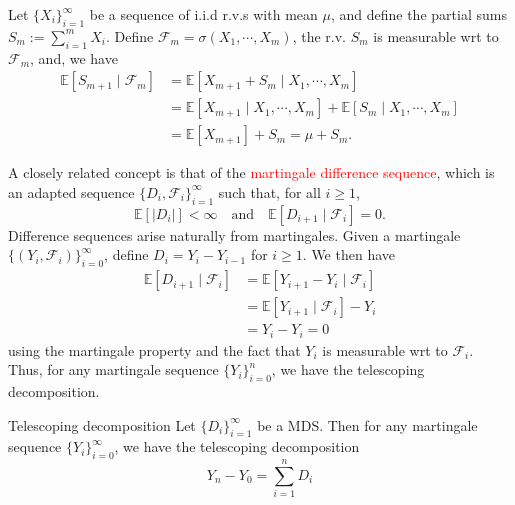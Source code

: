\documentclass[10pt,handout,english]{beamer}
\newcommand{\E}{\mathbb{E}}
\newcommand{\F}{\mathcal{F}}
\begin{document}
\begin{frame}[allowframebreaks]
\begin{example}
Let $\{X_i\}_{i=1}^{\infty}$ be a sequence of i.i.d r.v.s with mean $\mu$, and define the partial sums $S_m:=\sum\limits_{i=1}^mX_i$. Define $\F_{m}=\sigma(X_1,\cdots,X_m)$, the r.v. $S_m$ is measurable wrt to $\F_m$, and, we have
\begin{align*}
\E[S_{m+1}\mid \F_{m}]&=\E[X_{m+1}+S_{m}\mid X_1,\cdots,X_m ]\\
&=\E[X_{m+1}\mid X_1,\cdots,X_m]+\E[S_{m}\mid X_1,\cdots,X_m ]\\
&=\E[X_{m+1}]+S_m=\mu+S_m.
\end{align*}
\end{example}
A closely related concept is that of the \textcolor{red}{martingale difference sequence}, which is an adapted sequence $\{D_i,\F_{i}\}_{i=1}^{\infty}$ such that, for all $i\geq 1$,
\[
\E[\lvert D_i\rvert]<\infty\quad\text{and}\quad\E[D_{i+1}\mid\F_{i}]=0.
\] 
Difference sequences arise naturally from martingales. Given a martingale $\{(Y_i,\F_{i})\}_{i=0}^{\infty}$, define $D_i=Y_i-Y_{i-1}$ for $i\geq 1$. We then have
\begin{align*}
\E[D_{i+1}\mid\F_{i}]&=\E[Y_{i+1}-Y_{i}\mid\F_i]\\
&=\E[Y_{i+1}\mid\F_i]-Y_i\\
&=Y_i-Y_i=0
\end{align*}
using the martingale property and the fact that $Y_i$ is measurable wrt to $\F_i$. Thus, for any martingale sequence $\{Y_i\}_{i=0}^{n}$, we have the telescoping decomposition.
\begin{block}{Telescoping decomposition}
Let $\{D_i\}_{i=1}^{\infty}$ be a MDS. Then for any martingale sequence $\{Y_i\}_{i=0}^{\infty}$, we have the telescoping decomposition
\[
Y_n-Y_0=\sum\limits_{i=1}^{n}D_i
\]
\end{block} 
\end{frame}
\end{document}
